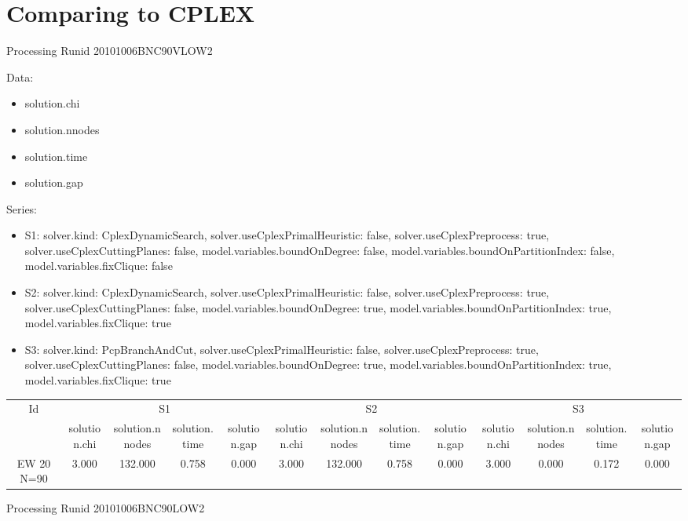 \documentclass[landscape, 12pt]{report}
\begin{document}
\section{Comparing to CPLEX}

Processing Runid 20101006BNC90VLOW2

Data:
\begin{itemize}
\item solution.chi
\item solution.nnodes
\item solution.time
\item solution.gap
\end{itemize}
Series:
\begin{itemize}
\item S1: solver.kind: CplexDynamicSearch, solver.useCplexPrimalHeuristic: false, solver.useCplexPreprocess: true, solver.useCplexCuttingPlanes: false, model.variables.boundOnDegree: false, model.variables.boundOnPartitionIndex: false, model.variables.fixClique: false
\item S2: solver.kind: CplexDynamicSearch, solver.useCplexPrimalHeuristic: false, solver.useCplexPreprocess: true, solver.useCplexCuttingPlanes: false, model.variables.boundOnDegree: true, model.variables.boundOnPartitionIndex: true, model.variables.fixClique: true
\item S3: solver.kind: PcpBranchAndCut, solver.useCplexPrimalHeuristic: false, solver.useCplexPreprocess: true, solver.useCplexCuttingPlanes: false, model.variables.boundOnDegree: true, model.variables.boundOnPartitionIndex: true, model.variables.fixClique: true
\end{itemize}
\begin{tabular}{|c|cccc|cccc|cccc|}
\hline
\multicolumn{1}{|c|}{Id} & \multicolumn{4}{|c|}{S1} & \multicolumn{4}{|c|}{S2} & \multicolumn{4}{|c|}{S3}
\\
 & solution.chi & solution.nnodes & solution.time & solution.gap & solution.chi & solution.nnodes & solution.time & solution.gap & solution.chi & solution.nnodes & solution.time & solution.gap
\\
\hline
EW 20 N=90 & 3.000 & 132.000 & 0.758 & 0.000 & 3.000 & 132.000 & 0.758 & 0.000 & 3.000 & 0.000 & 0.172 & 0.000
\\
\hline 
 \end{tabular}


Processing Runid 20101006BNC90LOW2
\end{document}
